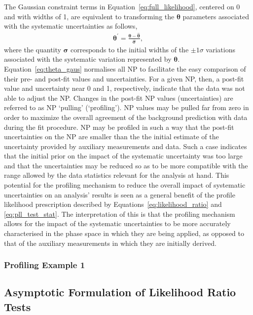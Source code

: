 The Gaussian constraint terms in Equation~\ref{eq:full_likelihood}, centered on 0 and with widths of 1,
are equivalent to transforming the $\bm{\theta}$ parameters associated with the systematic uncertainties as follows,
\begin{align}
    \bm{\theta}^{\prime} = \frac{\bm{\theta} - \bm{\hat{\theta}}}{\bm{\hat{\sigma}}},
    \label{eq:theta_gaus}
\end{align}
where the quantity $\bm{\sigma}$ corresponds to the initial widths of the $\pm 1 \sigma$ variations
associated with the systematic variation represented by $\bm{\theta}$.
Equation~\ref{eq:theta_gaus} normalises all NP to facilitate the easy comparison of their pre- and post-fit values and uncertainties.
For a given NP, then, a post-fit value and uncertainty near 0 and 1, respectively, indicate
that the data was not able to adjust the NP.
Changes in the post-fit NP values (uncertainties) are referred to as NP `pulling' (`profiling').
NP values may be pulled far from zero in order to maximize the overall agreement of the background prediction
with data during the fit procedure.
NP may be profiled in such a way that the post-fit uncertainties on the NP are smaller than the
the initial estimate of the uncertainty provided by auxiliary measurements and data.
Such a case indicates that the initial prior on the impact of the systematic uncertainty was too
large and that the uncertainties may be reduced so as to be more compatible  with the range allowed by
the data statistics relevant for the analysis at hand.
This potential for the profiling mechanism to reduce the overall impact of systematic uncertainties
on an analysis' results is seen as a general benefit of the profile likelihood prescription described
by Equations~\ref{eq:likelihood_ratio} and \ref{eq:pll_test_stat}.
The interpretation of this is that the profiling mechanism allows for the impact of the systematic uncertainties
to be more accurately characterised in the phase space in which they are being applied, as opposed
to that of the auxiliary measurements in which they are initially derived.

\subsubsection{Profiling Example 1}
\label{sec:profiling_example_1}

{\color{red}{Not sure if I want this}}

\subsection{Asymptotic Formulation of Likelihood Ratio Tests}

{\color{red}{Describe the asympotitc formula used for the analysis to be presented and illustrate
examples of how various p values are obtained, as well as how analysis sensitivity is optimized}}
